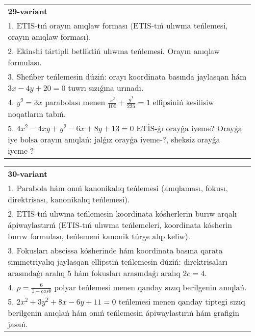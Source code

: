 \documentclass{article}
\begin{document}
\begin{tabular}{m{17cm}}
\textbf{29-variant}\\
1. ETIS-tıń orayın anıqlaw forması (ETIS-tıń ulıwma teńlemesi, orayın anıqlaw forması).\\

2. Ekinshi tártipli betliktiń ulıwma teńlemesi. Orayın anıqlaw formulası.\\

3. Sheńber teńlemesin dúziń: orayı koordinata basında jaylasqan hám $3 x-4 y+20=0$ tuwrı sızıǵına urınadı.\\

4. $y^{2} = 3x$ parabolası menen $\frac{x^{2}}{100} + \frac{y^{2}}{225} = 1$ ellipsiniń kesilisiw noqatların tabıń.  \\

5. $4x^{2} - 4xy + y^{2} - 6x + 8y + 13 = 0$ ETİS-ǵı orayǵa iyeme? Orayǵa iye bolsa orayın anıqlań: jalǵız orayǵa iyeme-?, sheksiz orayǵa iyeme-?  
\end{tabular}
\vspace{1cm}


\begin{tabular}{m{17cm}}
\textbf{30-variant}\\
1. Parabola hám onıń kanonikalıq teńlemesi (anıqlaması, fokusı, direktrisası, kanonikalıq teńlemesi).\\

2. ETIS-tıń ulıwma teńlemesin koordinata kósherlerin burıw arqalı ápiwaylastırıń (ETIS-tıń ulıwma teńlemeleri, koordinata kósherin burıw formulası, teńlemeni kanonik túrge alıp keliw).\\

3. Fokusları abscissa kósherinde hám koordinata basına qarata simmetriyalıq jaylasqan ellipstiń teńlemesin dúziń: direktrisaları arasındaǵı aralıq $5$ hám fokusları arasındaǵı aralıq $2 c=4$.\\

4. $\rho = \frac{6}{1 - cos\theta}$ polyar teńlemesi menen qanday sızıq berilgenin anıqlań.  \\

5. $2x^{2} + 3y^{2} + 8x - 6y + 11 = 0$ teńlemesi menen qanday tiptegi sızıq berilgenin anıqlań hám onıń teńlemesin ápiwaylastırıń hám grafigin jasań.  
\end{tabular}
\vspace{1cm}
\end{document}
